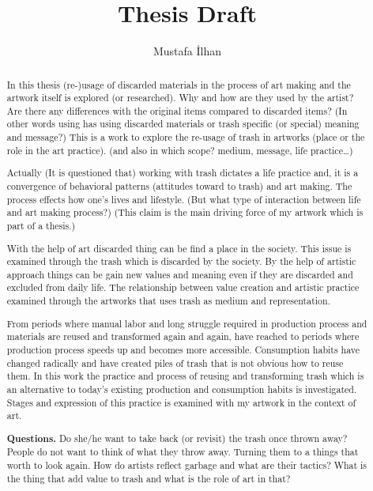 \documentclass[12pt]{report}
\begin{document}
\title{Thesis Draft}
\author{Mustafa İlhan}
\maketitle
{}
\tableofcontents

\begin{abstract}
In this thesis (re-)usage of discarded materials in the process of art making and the artwork itself is explored (or researched). Why and how are they used by the artist? Are there any differences with the original items compared to discarded items? (In other words using has using discarded materials or trash specific (or special) meaning and message?) This is a work to explore the re-usage of trash in artworks (place or the role in the art practice). (and also in which scope? medium, message, life practice\ldots) 

Actually (It is questioned that) working with trash dictates a life practice and, it is a convergence of behavioral patterns (attitudes toward to trash) and art making. The process effects how one's lives and lifestyle. (But what type of interaction between life and art making process?) (This claim is the main driving force of my artwork which is part of a thesis.)

With the help of art discarded thing can be find a place in the society. This issue is examined through the trash which is discarded by the society. By the help of artistic approach things can be gain new values and meaning even if they are discarded and excluded from daily life. The relationship between value creation and artistic practice examined through the artworks that uses trash as medium and representation.

From periods where manual labor and long struggle required in production process and materials are reused and transformed again and again, have reached to periods where production process speeds up and becomes more accessible. Consumption habits have changed radically and have created piles of trash that is not obvious how to reuse them. In this work the practice and process of reusing and transforming trash which is an alternative to today's existing production and consumption habits is investigated. Stages and expression of this practice is examined with my artwork in the context of art.

\textbf{Questions.} Do she/he want to take back (or revisit) the trash once thrown away? People do not want to think of what they throw away. Turning them to a things that worth to look again. How do artists reflect garbage and what are their tactics? What is the thing that add value to trash and what is the role of art in that?


\end{abstract}
\end{document}
